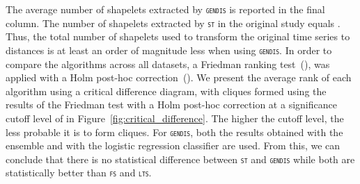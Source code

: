 \documentclass[runningheads]{llncs}
\begin{document}
The average number of shapelets extracted by \textsc{\texttt{gendis}} is reported in the final column. The number of shapelets extracted by \textsc{\texttt{st}} in the original study equals . Thus, the total number of shapelets used to transform the original time series to distances is at least an order of magnitude less when using \textsc{\texttt{gendis}}. In order to compare the algorithms across all datasets, a Friedman ranking test~(\cite{friedman1937use}), was applied with a Holm post-hoc correction~(\cite{holm1979simple,benavoli2016should}). We present the average rank of each algorithm using a critical difference diagram, with cliques formed using the results of the Friedman test with a Holm post-hoc correction at a significance cutoff level of  in Figure~\ref{fig:critical_difference}. The higher the cutoff level, the less probable it is to form cliques. For \textsc{\texttt{gendis}}, both the results obtained with the ensemble and with the logistic regression classifier are used. From this, we can conclude that there is no statistical difference between \textsc{\texttt{st}} and \textsc{\texttt{gendis}} while both are statistically better than \textsc{\texttt{fs}} and \textsc{\texttt{lts}}. \\
\end{document}
